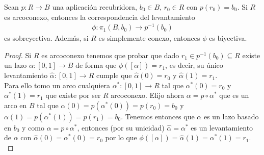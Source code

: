 \begin{teo}
    Sean $p:R \to B$ una aplicación recubridora, $b_0\in B$, $r_0\in R$ con $p(r_0)=b_0$. Si $R$ es arcoconexo, entonces la correspondencia del levantamiento 
    \begin{gather*}
        \phi: \pi_1(B,b_0) \to p^{-1}(b_0)
    \end{gather*}
    es sobreyectiva. Además, si $R$ es simplemente conexo, entonces $\phi$ es biyectiva.
    \begin{proof}
        Si $R$ es arcoconexo tenemos que probar que dado $r_1\in p^{-1}(b_0)\subseteq R$ existe un lazo $\alpha:[0,1]\to B$ de forma que $\phi([\alpha]) = r_1$, es decir, su único levantamiento $\hat{\alpha}:[0,1]\to R$ cumple que $\hat{\alpha}(0) = r_0$ y $\hat{\alpha}(1) = r_1$.\\

        Para ello tomo un arco cualquiera $\alpha^*:[0,1]\to R$ tal que $\alpha^*(0) = r_0$ y $\alpha^*(1) = r_1$ que existe por ser $R$ arcoconexo. Elijo ahora $\alpha = p\circ \alpha^*$ que es un arco en $B$ tal que $\alpha(0)= p(\alpha^*(0)) = p(r_0) = b_0$ y $\alpha(1) = p(\alpha^*(1)) = p(r_1) = b_0$. Tenemos entonces que $\alpha$ es un lazo basado en $b_0$ y como $\alpha=p\circ \alpha^*$, entonces (por su unicidad) $\hat{\alpha} = \alpha^*$ es un levantamiento de $\alpha$ con $\hat{\alpha}(0) = \alpha^*(0) = r_0$ por lo que $\phi([\alpha]) = \hat{\alpha}(1) = \alpha^*(1) = r_1$.\\


\end{proof}
\end{teo}
